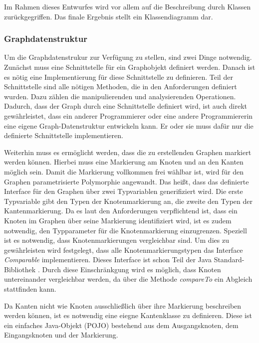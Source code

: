 \documentclass[a4paper,12pt,ngerman,chapterprefix=false,listof=totoc,bibliography=totoc]{scrreprt}
\begin{document}
{{{Im Rahmen dieses Entwurfes wird vor allem auf die Beschreibung durch Klassen zurückgegriffen. Das finale Ergebnis stellt ein Klassendiagramm dar.
}
\subsubsection*{Graphdatenstruktur}
{
Um die Graphdatenstrukur zur Verfügung zu stellen, sind zwei Dinge notwendig. Zunächst muss eine Schnittstelle für ein Graphobjekt definiert werden. Danach ist es nötig eine Implementierung für diese Schnittstelle zu definieren. Teil der Schnittstelle sind alle nötigen Methoden, die in den Anforderungen definiert wurden. Dazu zählen die manipulierenden und analysierenden Operationen. Dadurch, dass der Graph durch eine Schnittstelle definiert wird, ist auch direkt gewährleistet, dass ein anderer Programmierer oder eine andere Programmiererin eine eigene Graph-Datenstruktur entwickeln kann. Er oder sie muss dafür nur die definierte Schnittstelle implementieren.

Weiterhin muss es ermöglicht werden, dass die zu erstellenden Graphen markiert werden können. Hierbei muss eine Markierung am Knoten und an den Kanten möglich sein. Damit die Markierung vollkommen frei wählbar ist, wird für den Graphen parametrisierte Polymorphie angewandt. Das heißt, dass das definierte Interface für den Graphen über zwei Typvariablen generifiziert wird. Die erste Typvariable gibt den Typen der Knotenmarkierung an, die zweite den Typen der Kantenmarkierung. Da es laut den Anforderungen verpflichtend ist, dass ein Knoten im Graphen über seine Markierung identifiziert wird, ist es zudem notwendig, den Typparameter für die Knotenmarkierung einzugrenzen. Speziell ist es notwendig, dass Knotenmarkierungen vergleichbar sind. Um dies zu gewährleisten wird festgelegt, dass alle Knotenmarkierungstypen das Interface \textit{Comparable} implementieren. Dieses Interface ist schon Teil der Java Standard-Bibliothek \cite{oracle_java_2021}. Durch diese Einschränkgung wird es möglich, dass Knoten untereinander vergleichbar werden, da über die Methode \textit{compareTo} ein Abgleich stattfinden kann.

Da Kanten nicht wie Knoten ausschließlich über ihre Markierung beschreiben werden können, ist es notwendig eine eiegne Kantenklasse zu definieren. Diese ist ein einfaches Java-Objekt (POJO) bestehend aus dem Ausgangsknoten, dem Eingangsknoten und der Markierung.

}}}
\end{document}
